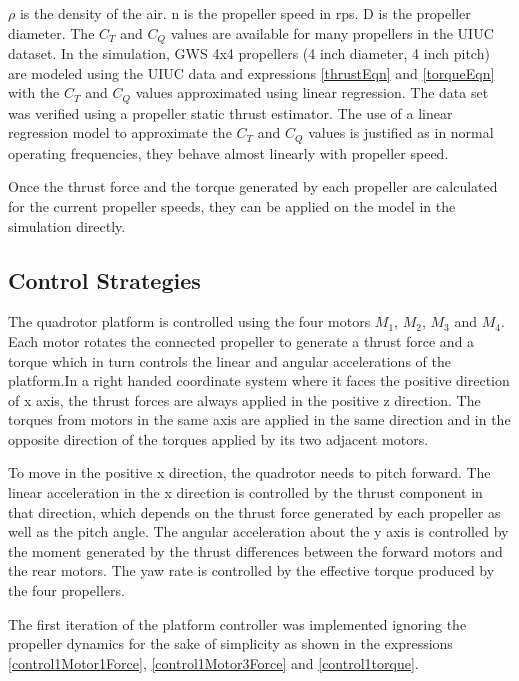 \documentclass[12pt,a4paper]{report}
\begin{document}
\(\rho\) is the density of the air. n is the propeller speed in rps. D is the propeller diameter. The \(C_{T}\) and \(C_{Q}\) values are available for many propellers in the UIUC dataset. In the simulation, GWS 4x4 propellers (4 inch diameter, 4 inch pitch) are modeled using the UIUC data and expressions \ref{thrustEqn} and \ref{torqueEqn} with the \(C_{T}\) and \(C_{Q}\) values approximated using linear regression. The data set was verified using a propeller static thrust estimator. The use of a linear regression model to approximate the \(C_{T}\) and \(C_{Q}\) values is justified as in normal operating frequencies, they behave almost linearly with propeller speed.\par 

Once the thrust force and the torque generated by each propeller are calculated for the current propeller speeds, they can be applied on the model in the simulation directly.\par

\subsection{Control Strategies}
\label{control}
The quadrotor platform is controlled using the four motors \(M_{1}\), \(M_{2}\), \(M_{3}\) and \(M_{4}\). Each motor rotates the connected propeller to generate a thrust force and a torque which in turn controls the linear and angular accelerations of the platform.In a right handed coordinate system where it faces the positive direction of x axis, the thrust forces are always applied in the positive z direction. The torques from motors in the same axis are applied in the same direction and in the opposite direction of the torques applied by its two adjacent motors. \par

To move in the positive x direction, the quadrotor needs to pitch forward. The linear acceleration in the x direction is controlled by the thrust component in that direction, which depends on the thrust force generated by each propeller as well as the pitch angle. The angular acceleration about the y axis is controlled by the moment generated by the thrust differences between the forward motors and the rear motors. The yaw rate is controlled by the effective torque produced by the four propellers.\par

The first iteration of the platform controller was implemented ignoring the propeller dynamics for the sake of simplicity as shown in the expressions \ref{control1Motor1Force}, \ref{control1Motor3Force} and \ref{control1torque}.\par
\end{document}
